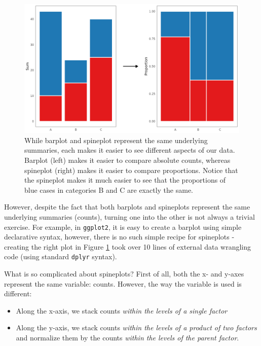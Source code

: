 \documentclass[
]{book}
\providecommand{\tightlist}{%
  \setlength{\itemsep}{0pt}\setlength{\parskip}{0pt}}
\theoremstyle{definition}
\theoremstyle{definition}
\theoremstyle{definition}
\theoremstyle{definition}
\theoremstyle{remark}
\begin{document}
\begin{figure}

{\centering \includegraphics[width=1\linewidth,height=1\textheight]{./figures/barplot-spineplot} 

}

\caption{While barplot and spineplot represent the same underlying summaries, each makes it easier to see different aspects of our data. Barplot (left) makes it easier to compare absolute counts, whereas spineplot (right) makes it easier to compare proportions. Notice that the spineplot makes it much easier to see that the proportions of blue cases in categories B and C are exactly the same.}\label{fig:barspine}
\end{figure}

However, despite the fact that both barplots and spineplots represent the same underlying summaries (counts), turning one into the other is not always a trivial exercise. For example, in \texttt{ggplot2}, it is easy to create a barplot using simple declarative syntax, however, there is no such simple recipe for spineplots - creating the right plot in Figure \ref{fig:barspine} took over 10 lines of external data wrangling code (using standard \texttt{dplyr} syntax).

What is so complicated about spineplots? First of all, both the x- and y-axes represent the same variable: counts. However, the way the variable is used is different:

\begin{itemize}
\tightlist
\item
  Along the x-axis, we stack counts \emph{within the levels of a single factor}
\item
  Along the y-axis, we stack counts \emph{within the levels of a product of two factors} and normalize them by the counts \emph{within the levels of the parent factor}.
\end{itemize}
\end{document}
